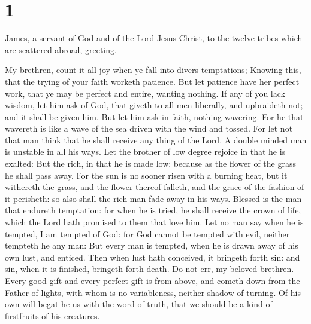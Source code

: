 \hypertarget{section}{%
\section{1}\label{section}}

 James, a servant of God and of the Lord Jesus Christ, to
the twelve tribes which are scattered abroad, greeting.

 My brethren, count it all joy when ye fall into divers
temptations;  Knowing this, that the trying of your faith
worketh patience.  But let patience have her perfect work,
that ye may be perfect and entire, wanting nothing.  If
any of you lack wisdom, let him ask of God, that giveth to all men
liberally, and upbraideth not; and it shall be given him. 
But let him ask in faith, nothing wavering. For he that wavereth is like
a wave of the sea driven with the wind and tossed.  For
let not that man think that he shall receive any thing of the Lord.
 A double minded man is unstable in all his ways.
 Let the brother of low degree rejoice in that he is
exalted:  But the rich, in that he is made low: because
as the flower of the grass he shall pass away.  For the
sun is no sooner risen with a burning heat, but it withereth the grass,
and the flower thereof falleth, and the grace of the fashion of it
perisheth: so also shall the rich man fade away in his ways.
 Blessed is the man that endureth temptation: for when he
is tried, he shall receive the crown of life, which the Lord hath
promised to them that love him.  Let no man say when he
is tempted, I am tempted of God: for God cannot be tempted with evil,
neither tempteth he any man:  But every man is tempted,
when he is drawn away of his own lust, and enticed.  Then
when lust hath conceived, it bringeth forth sin: and sin, when it is
finished, bringeth forth death.  Do not err, my beloved
brethren.  Every good gift and every perfect gift is from
above, and cometh down from the Father of lights, with whom is no
variableness, neither shadow of turning.  Of his own will
begat he us with the word of truth, that we should be a kind of
firstfruits of his creatures.

